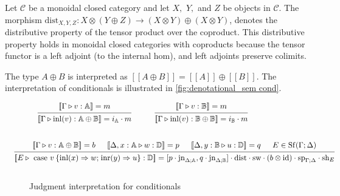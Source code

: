 \documentclass[10pt,a4paper]{amsart}
\theoremstyle{definition}
\theoremstyle{definition}
\theoremstyle{definition}
\theoremstyle{definition}
\theoremstyle{definition}
\theoremstyle{definition}
\begin{document}
 Let $\mathcal{C}$ be a monoidal closed category and let $X,$ $Y,$ and $Z$ be objects in $\mathcal{C}$. The morphism $\text{dist}_{X, Y,Z}: X \otimes  \left(Y \oplus Z\right) \xrightarrow{} \left(X \otimes Y\right) \oplus \left(X \otimes Y\right)$, denotes the distributive property of the tensor product over the coproduct.  This distributive property holds in monoidal closed categories with coproducts because the tensor functor is a left adjoint (to the internal hom), and left adjoints preserve colimits.

The type $A \oplus B$ is interpreted as $[\![A \oplus B ]\!] = [\![A ]\!] \oplus [\![ B ]\!]$. The interpretation of conditionals is illustrated in \autoref{fig:denotational_sem cond}.

\begin{figure}[H]
  \begin{equation*}
  \begin{aligned}
  &\hspace{10pt}
  \begin{prooftree}
      \hypo{ [\![\Gamma \triangleright v: \mathbb{A}]\!] = m }
      \infer1[]{ [\![ \Gamma \triangleright \text{inl} (v):  \mathbb{A} \oplus \mathbb{B}  ]\!] = i_{\mathbb{A}}  \cdot m}
  \end{prooftree}
  \hspace{30pt}
  \begin{prooftree}
    \hypo{ [\![\Gamma \triangleright v: \mathbb{B}]\!] = m }
    \infer1[]{ [\![ \Gamma \triangleright \text{inl} (v):  \mathbb{B} \oplus \mathbb{B}  ]\!] = i_{\mathbb{B}}  \cdot m}
\end{prooftree}
  \\[20pt]
  &\hspace{-20pt}
  \begin{prooftree}
      \hypo{[\![\Gamma\triangleright v: \mathbb{A} \oplus \mathbb{B} ]\!] = b}
      \hypo{[\![\Delta, x:\mathbb{A} \triangleright w: \mathbb{D} ]\!] = p}
      \hypo{ [\![\Delta,y:\mathbb{B} \triangleright u: \mathbb{D} ]\!] = q }
      \hypo{E \in \Shuff(\Gamma; \Delta)}
      \infer4[]{ [\![E \triangleright \text{ case } v \hspace{2pt}  \{\text{inl} (x) \Rightarrow w ; \hspace{1pt} \text{inr} (y) \Rightarrow u\}: \mathbb{D} ]\!] =   [p \cdot \text{jn}_{\Delta;\mathbb{A}},q \cdot \text{jn}_{\Delta;\mathbb{B}}] \cdot \text{dist} \cdot \text{sw} \cdot (b \otimes \text{id}) \cdot \text{sp}_{\Gamma;\Delta} \cdot \text{sh}_{E}}
  \end{prooftree}
  \\[10pt]
  \end{aligned}
  \end{equation*}
  \caption{Judgment interpretation for conditionals}
\label{fig:denotational_sem cond}
\end{figure}







 

\end{document}
